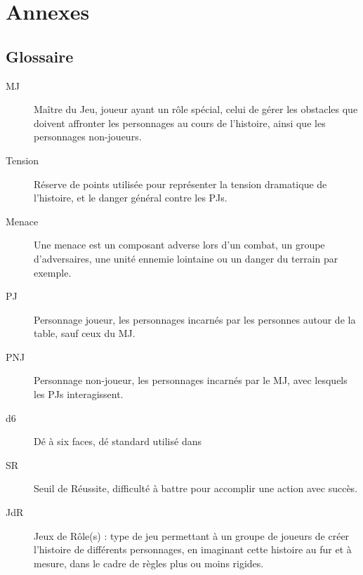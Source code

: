 \documentclass{report}
\begin{document}
\chapter*{Annexes}
\section*{Glossaire}
\begin{multicols}{2}\setlength{\columnsep}{0.5cm}
\setlength{\columnseprule}{0.5pt}
\begin{description}
\item[MJ] Maître du Jeu, joueur ayant un rôle spécial, celui de gérer les obstacles que doivent affronter les personnages au cours de l'histoire, ainsi que les personnages non-joueurs.
  \item[Tension] Réserve de points utilisée pour représenter la tension dramatique de l'histoire, et le danger général contre les PJs.
  \item[Menace] Une menace est un composant adverse lors d'un combat, un groupe d'adversaires, une unité ennemie lointaine ou un danger du terrain par exemple.
  \item[PJ] Personnage joueur, les personnages incarnés par les personnes autour de la table, sauf ceux du MJ.
  \item[PNJ]Personnage non-joueur, les personnages incarnés par le MJ, avec lesquels les PJs interagissent.
  \item[d6] Dé à six faces, dé standard utilisé dans \nomjeu
  \item[SR] Seuil de Réussite, difficulté à battre pour accomplir une action avec succès.
  \item[JdR] Jeux de Rôle(s) : type de jeu permettant à un groupe de joueurs de créer l'histoire de différents personnages, en imaginant cette histoire au fur et à mesure, dans le cadre de règles plus ou moins rigides.
  \item[\diminutif] \nomjeu
\end{description}
\end{multicols}
\end{document}
